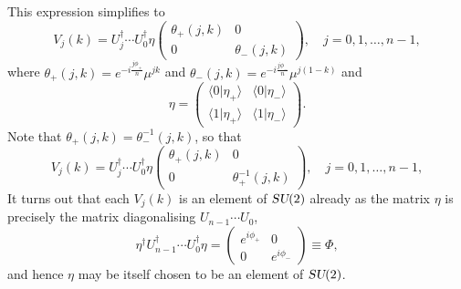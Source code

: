 \documentclass[12pt]{amsart}
\def\su2{\textsl{SU}(2)}
\theoremstyle{definition}
\theoremstyle{remark}
\numberwithin{equation}{section}
\begin{document}
This expression simplifies to
\begin{equation}
	V_j(k) = U_{j}^\dag\cdots U_0^\dag  \eta \begin{pmatrix} \theta_+(j,k) & 0 \\ 0 &  \theta_-(j,k)\end{pmatrix}, \quad j = 0, 1, \ldots, n-1,
\end{equation}
where $\theta_+(j,k) = e^{-i\frac{j\phi_{+}}{n}}\mu^{jk}$ and $\theta_-(j,k) = e^{-i\frac{j\phi_{-}}{n}}\mu^{j(1-k)}$ and 
\begin{equation}
	\eta = \begin{pmatrix}  \langle 0|\eta_{+}\rangle & \langle 0|\eta_{-}\rangle \\ \langle 1|\eta_{+}\rangle & \langle 1|\eta_{-}\rangle\end{pmatrix}.
\end{equation}
Note that $\theta_+(j,k) = \theta_-^{-1}(j,k)$, so that 
\begin{equation}
	V_j(k) = U_{j}^\dag\cdots U_0^\dag  \eta \begin{pmatrix} \theta_+(j,k) & 0 \\ 0 &  \theta_+^{-1}(j,k)\end{pmatrix}, \quad j = 0, 1, \ldots, n-1,
\end{equation}
It turns out that each $V_j(k)$ is an element of $\su2$ already as the matrix $\eta$ is precisely the matrix diagonalising $U_{n-1}\cdots U_0$,
\begin{equation}
	\eta^\dag U_{n-1}^\dag\cdots U_0^\dag \eta = \begin{pmatrix} e^{i\phi_+} & 0 \\ 0 &  e^{i\phi_-}\end{pmatrix}\equiv \Phi,
\end{equation}
and hence $\eta$ may be itself chosen to be an element of $\su2$.
\end{document}
